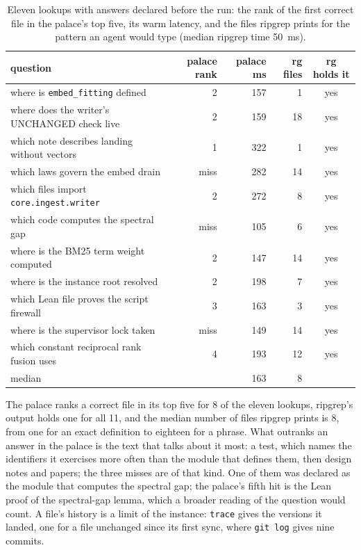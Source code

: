 \documentclass[11pt]{article}
\theoremstyle{plain}
\theoremstyle{definition}
\theoremstyle{remark}
\newcommand{\code}[1]{\texttt{#1}}
\newcommand{\hits}{8}
\newcommand{\rghits}{all 11}
\newcommand{\rgfiles}{8}
\begin{document}
\begin{table}[t]
\centering\small
\begin{tabular}{@{}lrrrc@{}}
\toprule
question & palace rank & palace ms & rg files & rg holds it \\
\midrule
where is \code{embed\_fitting} defined & 2 & 157 & 1 & yes \\
where does the writer's UNCHANGED check live & 2 & 159 & 18 & yes \\
which note describes landing without vectors & 1 & 322 & 1 & yes \\
which laws govern the embed drain & miss & 282 & 14 & yes \\
which files import \code{core.ingest.writer} & 2 & 272 & 8 & yes \\
which code computes the spectral gap & miss & 105 & 6 & yes \\
where is the BM25 term weight computed & 2 & 147 & 14 & yes \\
where is the instance root resolved & 2 & 198 & 7 & yes \\
which Lean file proves the script firewall & 3 & 163 & 3 & yes \\
where is the supervisor lock taken & miss & 149 & 14 & yes \\
which constant reciprocal rank fusion uses & 4 & 193 & 12 & yes \\
\midrule
median & & 163 & 8 & \\
\bottomrule
\end{tabular}
\caption{Eleven lookups with answers declared before the run: the rank of the first correct file
in the palace's top five, its warm latency, and the files ripgrep prints for the
pattern an agent would type (median ripgrep time 50~ms).}\label{tab:lookups}
\end{table}

The palace ranks a correct file in its top five for \hits{} of the eleven lookups, ripgrep's
output holds one for \rghits{}, and the median number of files ripgrep prints is \rgfiles{},
from one for an exact definition to eighteen for a phrase. What outranks an answer in the palace is
the text that talks about it most: a test, which names the identifiers it exercises more often than
the module that defines them, then design notes and papers; the three misses are of that kind. One
of them was declared as the module that computes the spectral gap; the palace's fifth hit is the
Lean proof of the spectral-gap lemma, which a broader reading of the question would count. A
file's history is a limit of the instance: \code{trace} gives the versions it landed, one for a
file unchanged since its first sync, where \code{git log} gives nine commits.
\end{document}
